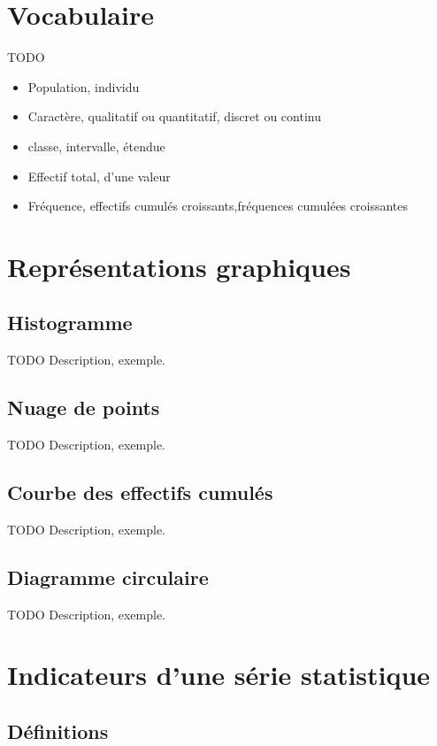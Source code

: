\section{Vocabulaire}

TODO

\begin{itemize}
  \item Population, individu
  \item Caractère, qualitatif ou quantitatif, discret ou continu
  \item classe, intervalle, étendue
  \item Effectif total, d'une valeur
  \item Fréquence, effectifs cumulés croissants,fréquences cumulées croissantes
\end{itemize}

\section{Représentations graphiques}

\subsection{Histogramme}

TODO Description, exemple.

\subsection{Nuage de points}

TODO Description, exemple.

\subsection{Courbe des effectifs cumulés}

TODO Description, exemple.

\subsection{Diagramme circulaire}

TODO Description, exemple.


\section{Indicateurs d'une série statistique}

\subsection{Définitions}

